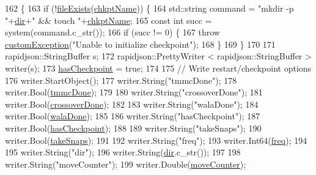 \begin{DoxyCode}
162                                                                                                            
                      \{
163     \textcolor{keywordflow}{if} (!\hyperlink{utilities_8cpp_a9d1e3672fd331d4185c1763c80226307}{fileExists}(\hyperlink{classcheckpoint_a477eea21621f066889660ed426dc800f}{chkptName})) \{
164         std::string command = \textcolor{stringliteral}{"mkdir -p "}+\hyperlink{classcheckpoint_a0e0f999ee8e0b09541e9131baa8a591d}{dir}+\textcolor{stringliteral}{" && touch "}+\hyperlink{classcheckpoint_a477eea21621f066889660ed426dc800f}{chkptName};
165         \textcolor{keyword}{const} \textcolor{keywordtype}{int} succ = system(command.c\_str());
166         \textcolor{keywordflow}{if} (succ != 0) \{
167             \textcolor{keywordflow}{throw} \hyperlink{classcustom_exception}{customException}(\textcolor{stringliteral}{"Unable to initialize checkpoint"});
168         \}
169     \}
170 
171     rapidjson::StringBuffer s;
172     rapidjson::PrettyWriter < rapidjson::StringBuffer > writer(s);
173     \hyperlink{classcheckpoint_aa75f306fcb0c2360d948fa3a61adfed5}{hasCheckpoint} = \textcolor{keyword}{true};
174 
175     \textcolor{comment}{// Write restart/checkpoint options}
176     writer.StartObject();
177     writer.String(\textcolor{stringliteral}{"tmmcDone"});
178     writer.Bool(\hyperlink{classcheckpoint_acbe0c62aa82735741a9f396827966823}{tmmcDone});
179 
180     writer.String(\textcolor{stringliteral}{"crossoverDone"});
181     writer.Bool(\hyperlink{classcheckpoint_a4f13612ea6d376bb327295bfce3a70c5}{crossoverDone});
182 
183     writer.String(\textcolor{stringliteral}{"walaDone"});
184     writer.Bool(\hyperlink{classcheckpoint_aab066479e2ca6656d0031dd46a2fc1a5}{walaDone});
185 
186     writer.String(\textcolor{stringliteral}{"hasCheckpoint"});
187     writer.Bool(\hyperlink{classcheckpoint_aa75f306fcb0c2360d948fa3a61adfed5}{hasCheckpoint});
188 
189     writer.String(\textcolor{stringliteral}{"takeSnaps"});
190     writer.Bool(\hyperlink{classcheckpoint_a685226e8bae8084937f73f65c326c362}{takeSnaps});
191 
192     writer.String(\textcolor{stringliteral}{"freq"});
193     writer.Int64(\hyperlink{classcheckpoint_a11a2d78eb0bf6045b659a4d18b53da44}{freq});
194 
195     writer.String(\textcolor{stringliteral}{"dir"});
196     writer.String(\hyperlink{classcheckpoint_a0e0f999ee8e0b09541e9131baa8a591d}{dir}.c\_str());
197 
198     writer.String(\textcolor{stringliteral}{"moveCounter"});
199     writer.Double(\hyperlink{classcheckpoint_a5ab49a355714da4874aba00eb03f701d}{moveCounter});

\end{DoxyCode}
